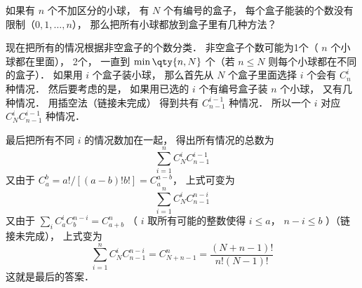 
\begin{issues}
\issueDraft
\end{issues}


如果有 $n$ 个不加区分的小球， 有 $N$ 个有编号的盒子， 每个盒子能装的个数没有限制（$0, 1, \dots, n$）， 那么把所有小球都放到盒子里有几种方法？

现在把所有的情况根据非空盒子的个数分类． 非空盒子个数可能为1个（ $n$ 个小球都在里面）， 2个， 一直到 $\min\qty{n,N}$ 个（若 $n\leqslant N$ 则每个小球都在不同的盒子）． 如果用 $i$ 个盒子装小球， 那么首先从 $N$ 个盒子里面选择 $i$ 个会有 $C_n^i$ 种情况． 然后要考虑的是， 如果用已选的 $i$ 个有编号盒子装 $n$ 个小球， 又有几种情况． 用插空法（链接未完成）
得到共有 $C_{n-1}^{i-1}$ 种情况． 所以一个 $i$ 对应 $C_N^i C_{n-1}^{i-1}$ 种情况．

最后把所有不同 $i$ 的情况数加在一起， 得出所有情况的总数为
\begin{equation}
\sum_{i = 1}^n C_N^i C_{n-1}^{i-1}
\end{equation}
又由于 $C_a^b = a!/[(a-b)!b!] = C_a^{a-b}$， 上式可变为
\begin{equation}
\sum_{i=1}^n  C_N^i C_{n-1}^{n-i}
\end{equation}
又由于 $\sum_i C_a^i C_b^{n-i} = C_{a+b}^n$ （ $i$ 取所有可能的整数使得 $i \leqslant a$，  $n - i \leqslant b$  ）（链接未完成）， 上式变为
\begin{equation}
\sum_{i=1}^n C_N^i C_{n-1}^{n-i} = C_{N+n-1}^n = \frac{(N+n-1)!}{n!(N - 1)!}
\end{equation}
这就是最后的答案．

